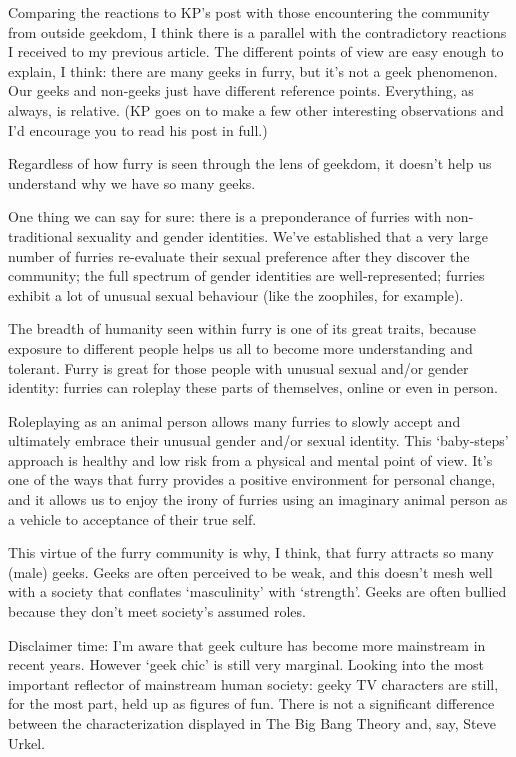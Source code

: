 Comparing the reactions to KP's post with those encountering the community from outside geekdom, I think there is a parallel with the contradictory reactions I received to my previous article. The different points of view are easy enough to explain, I think: there are many geeks in furry, but it's not a geek phenomenon. Our geeks and non-geeks just have different reference points. Everything, as always, is relative. (KP goes on to make a few other interesting observations and I'd encourage you to read his post in full.)

Regardless of how furry is seen through the lens of geekdom, it doesn't help us understand why we have so many geeks.

One thing we can say for sure: there is a preponderance of furries with non-traditional sexuality and gender identities. We've established that a very large number of furries re-evaluate their sexual preference after they discover the community; the full spectrum of gender identities are well-represented; furries exhibit a lot of unusual sexual behaviour (like the zoophiles, for example).

The breadth of humanity seen within furry is one of its great traits, because exposure to different people helps us all to become more understanding and tolerant. Furry is great for those people with unusual sexual and/or gender identity: furries can roleplay these parts of themselves, online or even in person.

Roleplaying as an animal person allows many furries to slowly accept and ultimately embrace their unusual gender and/or sexual identity. This `baby-steps' approach is healthy and low risk from a physical and mental point of view. It's one of the ways that furry provides a positive environment for personal change, and it allows us to enjoy the irony of furries using an imaginary animal person as a vehicle to acceptance of their true self.

This virtue of the furry community is why, I think, that furry attracts so many (male) geeks. Geeks are often perceived to be weak, and this doesn't mesh well with a society that conflates `masculinity' with `strength'. Geeks are often bullied because they don't meet society's assumed roles.

Disclaimer time: I'm aware that geek culture has become more mainstream in recent years. However `geek chic' is still very marginal. Looking into the most important reflector of mainstream human society: geeky TV characters are still, for the most part, held up as figures of fun. There is not a significant difference between the characterization displayed in The Big Bang Theory and, say, Steve Urkel.


